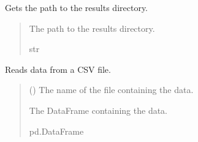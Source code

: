 \documentclass[letterpaper,10pt,english]{sphinxmanual}
\begin{document}
\begin{fulllineitems}
\begin{fulllineitems}
\label{\detokenize{application.services:application.services.FileSystemService.FileSystemService.get_results_path}}
\pysigstartsignatures
{}
\pysigstopsignatures
\sphinxAtStartPar
Gets the path to the results directory.
\begin{quote}\begin{description}
\sphinxAtStartPar
The path to the results directory.

\sphinxAtStartPar
str

\end{description}\end{quote}

\end{fulllineitems}


\begin{fulllineitems}
\label{\detokenize{application.services:application.services.FileSystemService.FileSystemService.read_dataFrom}}
\pysigstartsignatures
{}
\pysigstopsignatures
\sphinxAtStartPar
Reads data from a CSV file.
\begin{quote}\begin{description}
\sphinxAtStartPar
{} () \textendash{} The name of the file containing the data.

\sphinxAtStartPar
The DataFrame containing the data.

\sphinxAtStartPar
pd.DataFrame

\end{description}\end{quote}

\end{fulllineitems}



\end{fulllineitems}
\end{document}
